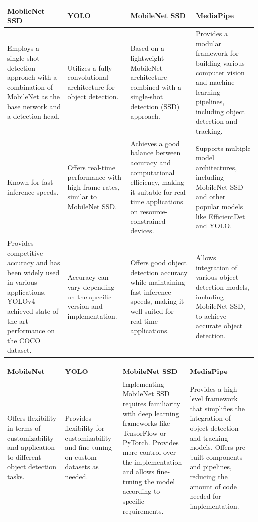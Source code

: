 \documentclass[a4paper,12pt,oneside]{book}
\begin{document}
\begin{tabular}{|p{}|p{}|p{}|p{}|}
\hline
\textbf{MobileNet SSD} & \textbf{YOLO} & \textbf{MobileNet SSD} & \textbf{MediaPipe} \\
\hline
Employs a single-shot detection approach with a combination of MobileNet as the base network and a detection head. & Utilizes a fully convolutional architecture for object detection. & Based on a lightweight MobileNet architecture combined with a single-shot detection (SSD) approach. & Provides a modular framework for building various computer vision and machine learning pipelines, including object detection and tracking. \\
\hline
Known for fast inference speeds. & Offers real-time performance with high frame rates, similar to MobileNet SSD. & Achieves a good balance between accuracy and computational efficiency, making it suitable for real-time applications on resource-constrained devices. & Supports multiple model architectures, including MobileNet SSD and other popular models like EfficientDet and YOLO. \\
\hline
Provides competitive accuracy and has been widely used in various applications. YOLOv4 achieved state-of-the-art performance on the COCO dataset. & Accuracy can vary depending on the specific version and implementation. & Offers good object detection accuracy while maintaining fast inference speeds, making it well-suited for real-time applications. & Allows integration of various object detection models, including MobileNet SSD, to achieve accurate object detection. \\
\hline


\end{tabular}


\begin{tabular}{|p{}|p{}|p{}|p{}|}
\hline
\textbf{MobileNet } & \textbf{YOLO} & \textbf{MobileNet SSD} & \textbf{MediaPipe} \\
\hline
Offers flexibility in terms of customizability and application to different object detection tasks. & Provides flexibility for customizability and fine-tuning on custom datasets as needed. & Implementing MobileNet SSD requires familiarity with deep learning frameworks like TensorFlow or PyTorch. Provides more control over the implementation and allows fine-tuning the model according to specific requirements. & Provides a high-level framework that simplifies the integration of object detection and tracking models. Offers pre-built components and pipelines, reducing the amount of code needed for implementation. \\
\hline
\end{tabular}
\end{document}
